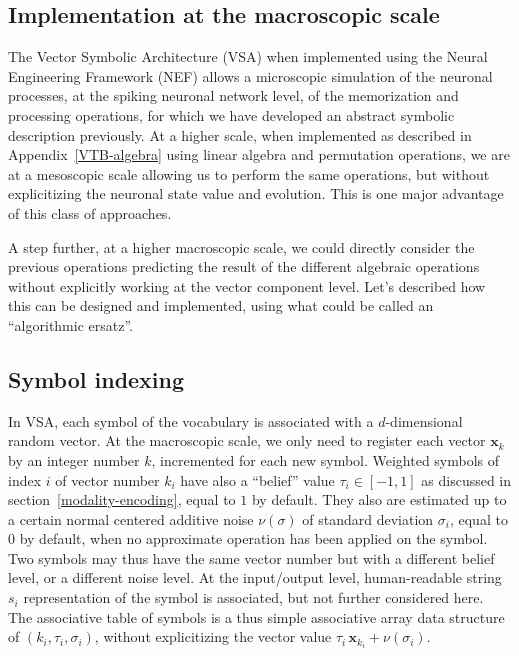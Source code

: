 \documentclass[sn-mathphys]{sn-jnl}
\begin{document}
\begin{appendices}
\clearpage

\section{Implementation at the macroscopic scale} \label{algorithmic-ersatz}

The Vector Symbolic Architecture (VSA) when implemented using the Neural Engineering Framework (NEF) allows a microscopic simulation of the neuronal processes, at the spiking neuronal network level, of the memorization and processing operations, for which we have developed an abstract symbolic description previously. At a higher scale, when implemented as described in Appendix~\ref{VTB-algebra} using linear algebra and permutation operations, we are at a mesoscopic scale allowing us to perform the same operations, but without explicitizing the neuronal state value and evolution. This is one major advantage of this class of approaches.

A step further, at a higher macroscopic scale, we could directly consider the previous operations predicting the result of the different algebraic operations without explicitly working at the vector component level. Let's described how this can be designed and implemented, using what could be called an ``algorithmic ersatz''.

\subsection*{Symbol indexing}

In VSA, each symbol of the vocabulary is associated with a $d$-dimensional random vector. At the macroscopic scale, we only need to register each vector $\mathbf{x}_k$ by an integer number $k$, incremented for each new symbol. Weighted symbols of index $i$ of vector number $k_i$ have also a ``belief'' value $\tau_i \in [-1, 1]$ as discussed in section~\ref{modality-encoding}, equal to $1$ by default. They also are estimated up to a certain normal centered additive noise $\nu(\sigma)$ of standard deviation $\sigma_i$, equal to $0$ by default, when no approximate operation has been applied on the symbol. Two symbols may thus have the same vector number but with a different belief level, or a different noise level. At the input/output level, human-readable string $s_i$ representation of the symbol is associated, but not further considered here. The associative table of symbols is a thus simple associative array data structure of $(k_i, \tau_i, \sigma_i)$, without explicitizing the vector value $\tau_i \, \mathbf{x}_{k_i} + \nu(\sigma_i)$.


\end{appendices}
\end{document}
